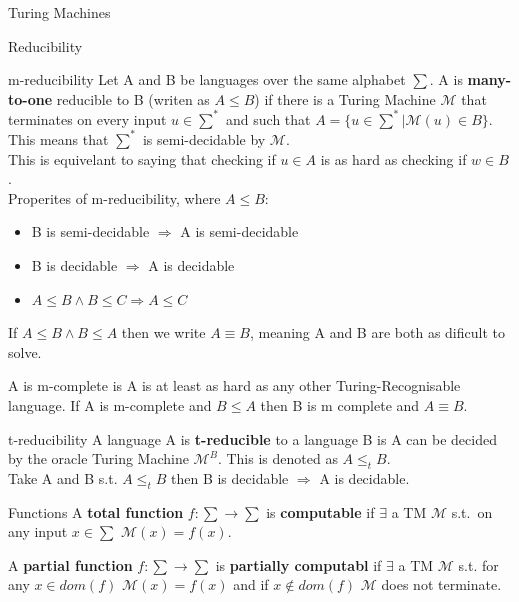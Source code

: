 \documentclass[12pt, letterpaper]{article}
\begin{document}
\begin{section}{Turing Machines}
\begin{subsection}{Reducibility}
    \begin{subsubsection}{m-reducibility}
      Let A and B be languages over the same alphabet \(\sum\).
      A is \textbf{many-to-one} reducible to B (writen as \(A \leq B\)) if
      there is a Turing Machine \(\mathscr{M}\) that terminates on every input
      \(u \in \sum^{*}\) and such that \(A=\{{} u \in \sum^{*} | \mathscr{M}(u) \in B\}\).
      This means that \(\sum^{*}\) is semi-decidable by \(\mathscr{M}\). \\
      This is equivelant to saying that checking if \(u \in A\) is as hard as
      checking if \(w \in B\). \\
      Properites of m-reducibility, where \(A \leq B\):
      \begin{itemize}
        \item B is semi-decidable \(\Rightarrow\) A is semi-decidable
        \item B is decidable \(\Rightarrow\) A is decidable
        \item \(A \leq B \land B \leq C \Rightarrow A \leq C\)
      \end{itemize}

      If \(A \leq B \land B \leq A\) then we write \(A \equiv B\), meaning
      A and B are both as dificult to solve.

      A is m-complete is A is at least as hard as any other Turing-Recognisable language.
      If A is m-complete and \(B \leq A\) then B is m complete and \(A \equiv B\).
    \end{subsubsection}

    \begin{subsubsection}{t-reducibility}
      A language A is \textbf{t-reducible} to a language B is A can be decided
      by the oracle Turing Machine \(\mathscr{M}^{B}\). This is denoted as
      \(A \leq_{t} B\). \\
      Take A and B s.t. \(A \leq_{t} B\) then
      B is decidable \(\Rightarrow\) A is decidable.
    \end{subsubsection}

  \end{subsection}

  \begin{subsection}{Functions}
    A \textbf{total function} \(f: \sum \rightarrow \sum\) is \textbf{computable} if
    \(\exists\) a TM \(\mathscr{M}\) s.t.\ on any input \(x \in \sum\)
    \(\mathscr{M}(x) = f(x)\).

    A \textbf{partial function} \(f: \sum \rightarrow \sum\) is
    \textbf{partially computabl} if \(\exists\) a TM \(\mathscr{M}\) s.t.
    for any \(x \in dom(f)\) \(\mathscr{M}(x) = f(x)\) and if \(x \notin dom(f)\)
    \(\mathscr{M}\) does not terminate.


\end{subsection}
\end{section}
\end{document}
